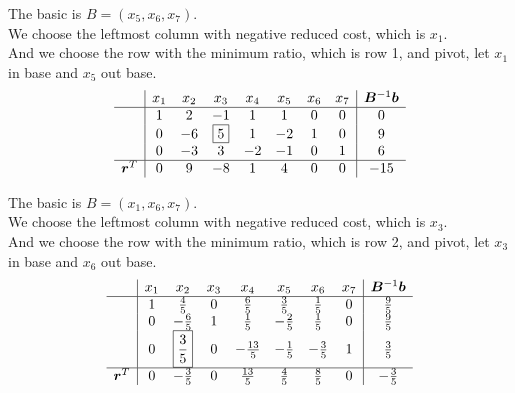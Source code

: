 \documentclass[10pt]{article}
\renewcommand{\mathbf}{\boldsymbol}
\begin{document}
The basic is $B=(x_5,x_6,x_7)$.\\
We choose the leftmost column with negative reduced cost, which is $x_1$.\\
And we choose the row with the minimum ratio, which is row 1, and pivot, let $x_1$ in base and $x_5$ out base.\\

\begin{equation}
	\begin{aligned}
		\begin{array}{c|ccccccc|c}
			& x_1 & x_2 & x_3 & x_4 & x_5 & x_6 & x_7 & \mathbf{B}^{-1}\mathbf{b} \\
			\hline
			& 1 & 2 & -1 & 1 & 1 & 0 & 0 & 0 \\
			& 0 & -6 & \boxed{5} & 1 & -2 & 1 & 0 & 9 \\
			& 0 & -3 & 3 & -2 & -1 & 0 & 1 & 6 \\
			\hline
			\mathbf{r}^T & 0 & 9 & -8 & 1 & 4 & 0 & 0 & -15 \\
		\end{array}
	\end{aligned}
\end{equation}

The basic is $B=(x_1,x_6,x_7)$.\\
We choose the leftmost column with negative reduced cost, which is $x_3$.\\
And we choose the row with the minimum ratio, which is row 2, and pivot, let $x_3$ in base and $x_6$ out base.\\

\begin{equation}
	\begin{aligned}
		\begin{array}{c|ccccccc|c}
			& x_1 & x_2 & x_3 & x_4 & x_5 & x_6 & x_7 & \mathbf{B}^{-1}\mathbf{b} \\
			\hline
			& 1 & \frac{4}{5} & 0 & \frac{6}{5} & \frac{3}{5} & \frac{1}{5} & 0 & \frac{9}{5} \\
			& 0 & -\frac{6}{5} & 1 & \frac{1}{5} & -\frac{2}{5} & \frac{1}{5} & 0 & \frac{9}{5} \\
			& 0 & \boxed{\frac{3}{5}} & 0 & -\frac{13}{5} & -\frac{1}{5} & -\frac{3}{5} & 1 & \frac{3}{5} \\
			\hline
			\mathbf{r}^T & 0 & -\frac{3}{5} & 0 & \frac{13}{5} & \frac{4}{5} & \frac{8}{5} & 0 & -\frac{3}{5} \\
		\end{array}
	\end{aligned}
\end{equation}
\end{document}
